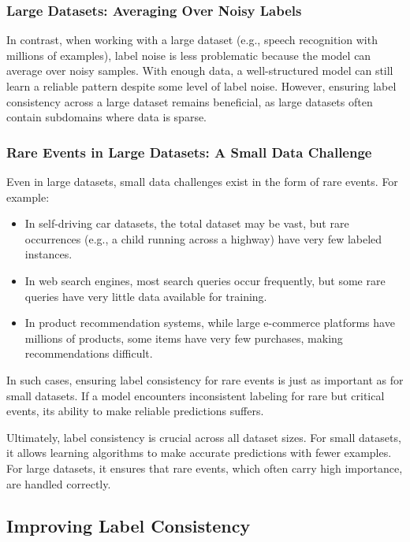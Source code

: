 \documentclass[12pt,openany]{book}
\begin{document}
\subsubsection{Large Datasets: Averaging Over Noisy Labels}
In contrast, when working with a large dataset (e.g., speech recognition with millions of examples), label noise is less problematic because the model can average over noisy samples. With enough data, a well-structured model can still learn a reliable pattern despite some level of label noise. However, ensuring label consistency across a large dataset remains beneficial, as large datasets often contain subdomains where data is sparse.

\subsubsection{Rare Events in Large Datasets: A Small Data Challenge}
Even in large datasets, small data challenges exist in the form of rare events. For example:
\begin{itemize}
    \item In self-driving car datasets, the total dataset may be vast, but rare occurrences (e.g., a child running across a highway) have very few labeled instances.
    \item In web search engines, most search queries occur frequently, but some rare queries have very little data available for training.
    \item In product recommendation systems, while large e-commerce platforms have millions of products, some items have very few purchases, making recommendations difficult.
\end{itemize}

In such cases, ensuring label consistency for rare events is just as important as for small datasets. If a model encounters inconsistent labeling for rare but critical events, its ability to make reliable predictions suffers. \newline

Ultimately, label consistency is crucial across all dataset sizes. For small datasets, it allows learning algorithms to make accurate predictions with fewer examples. For large datasets, it ensures that rare events, which often carry high importance, are handled correctly.

\subsection{Improving Label Consistency}
\end{document}
